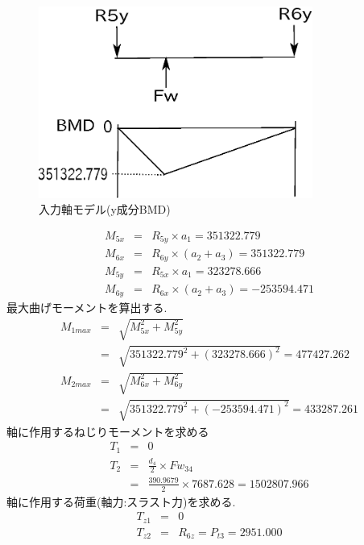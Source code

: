 \begin{figure}[htbp]
\begin{center}
\includegraphics[width=9cm]{../picture/jiku33.eps}
\end{center}
\caption{入力軸モデル(y成分BMD)}
\end{figure}
\begin{eqnarray}
M_{5x} &=& R_{5y} \times a_1=351322.779\\
M_{6x} &=& R_{6y} \times (a_2+a_3)=351322.779\\
M_{5y} &=& R_{5x} \times a_1=323278.666\\
M_{6y} &=& R_{6x} \times (a_2+a_3)=-253594.471
\end{eqnarray}
最大曲げモーメントを算出する.
\begin{eqnarray}
M_{1max} &=& \sqrt {M_{5x}^2+M_{5y}^2}\\
         &=& \sqrt {351322.779^2+(323278.666)^2}=477427.262\\
M_{2max} &=& \sqrt {M_{6x}^2+M_{6y}^2}\\
         &=& \sqrt {351322.779^2+(-253594.471)^2}=433287.261
\end{eqnarray}
軸に作用するねじりモーメントを求める
\begin{eqnarray}
T_{1} &=& 0\\
T_{2} &=& \frac{d_4}{2} \times Fw_{34}\\
      &=& \frac{390.9679}{2} \times 7687.628 = 1502807.966
\end{eqnarray}
軸に作用する荷重(軸力:スラスト力)を求める.
\begin{eqnarray}
T_{z1} &=& 0\\
T_{z2} &=& R_{6z} = P_{t3} = 2951.000
\end{eqnarray}
